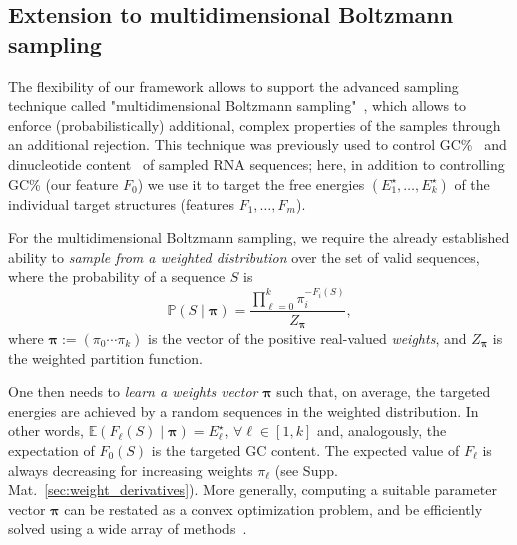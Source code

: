 \documentclass[]{bmcart}
\newcommand{\val}{\bar S} %
\newcommand{\partfun}[1]{Z_{#1}}
\newcommand{\F}{\mathcal{F}}
\newcommand{\Def}[1]{\emph{#1}}
\newcommand{\TargetE}{E^{\star}}
\newcommand{\Nuc}[1]{{\sf #1}}
\newcommand{\Cb}{\Nuc{C}}
\newcommand{\Gb}{\Nuc{G}}
\newcommand{\GCb}{\Gb\Cb}
\newcommand{\citep}[1]{\cite{#1}}
\begin{document}
\subsection*{Extension to multidimensional Boltzmann sampling}\label{sec:multiBoltzmann}
The flexibility of our framework allows to support the advanced sampling technique called "multidimensional Boltzmann sampling"~\citep{Bodini2010}, which allows to enforce (probabilistically)  additional, complex properties of the samples through an additional rejection.
This technique was previously used to control \GCb\%~\citep{Waldispuehl2011,Reinharz2013} and dinucleotide content~\citep{Zhang2013} of sampled RNA sequences; here, in addition to controlling \GCb\% (our feature $F_0$) we use it to target the free energies $(\TargetE_1,\ldots,\TargetE_k)$ of the individual target structures (features $F_1,\dots,F_m$).

For the multidimensional Boltzmann sampling, we require the already established ability to \Def{sample from a weighted distribution} over the set of valid sequences, where the probability of a sequence $S$ is
$$\mathbb{P}(S\mid \pmb{\pi}) = \frac{\prod_{\ell=0}^{k} \pi_i^{-F_i(S)}}{\partfun{\pmb{\pi}}},$$
where $\pmb{\pi}:=(\pi_0\cdots\pi_k)$ is the vector of the positive real-valued \Def{weights}, and $\partfun{\pmb{\pi}}$ is the weighted partition function.


One then needs to \Def{learn a weights vector} $\pmb{\pi}$ such that, on average, the targeted energies are achieved by a random sequences in the weighted distribution. In other words,  $\mathbb{E}(F_\ell(S)\mid \pmb{\pi})=\TargetE_\ell$,  $\forall\ell\in[1,k]$ and, analogously, the expectation of $F_0(S)$ is the targeted GC content.
The expected value of $F_\ell$ is always decreasing for increasing weights $\pi_\ell$ (see Supp. Mat.~\ref{sec:weight_derivatives}). More generally, computing a suitable parameter vector $\pmb{\pi}$ can be restated as a convex optimization problem, and be efficiently solved using a wide array of methods~\citep{Denise2010,Bendkowski2017}.
\end{document}
